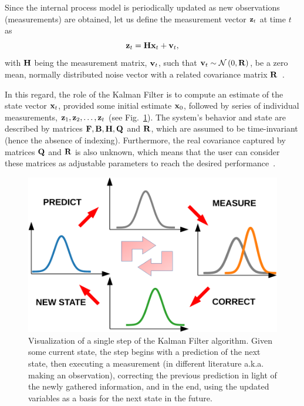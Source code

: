 Since the internal process model is periodically updated as new observations (measurements) are obtained, let us define the measurement vector $\mathbf{z}_t$ at time $t$ as
\begin{equation}
    \mathbf{z}_t = \mathbf{H} \mathbf{x}_t + \mathbf{v}_t,
\end{equation}
with $\mathbf{H}$ being the measurement matrix, $\mathbf{v}_t$, such that $\mathbf{v}_{t} \sim \mathcal{N} \left( {0, \mathbf{R}} \right)$, be a zero mean, normally distributed noise vector with a related covariance matrix $\mathbf{R}$~\cite{kim2018introduction}.

In this regard, the role of the Kalman Filter is to compute an estimate of the state vector $\mathbf{x}_t$, provided some initial estimate $\mathbf{x}_0$, followed by series of individual measurements, $\mathbf{z}_1, \mathbf{z}_2, \dots, \mathbf{z}_t$ (see Fig.~\ref{fig:KalmanFilterDiagram}). The system's behavior and state are described by matrices $\mathbf{F}, \mathbf{B}, \mathbf{H}, \mathbf{Q}$ and $\mathbf{R}$, which are assumed to be time-invariant (hence the absence of indexing). Furthermore, the real covariance captured by matrices $\mathbf{Q}$ and $\mathbf{R}$ is also unknown, which means that the user can consider these matrices as adjustable parameters to reach the desired performance~\cite{kim2018introduction}.

\begin{figure}[t]
    \centerline{\includegraphics[width=0.7\linewidth]{figures/theoretical_foundations/kalman_filter_diagram.pdf}}
    \caption[A single iteration of the Kalman Filter]{Visualization of a single step of the Kalman Filter algorithm. Given some current state, the step begins with a prediction of the next state, then executing a measurement (in different literature a.k.a. making an observation), correcting the previous prediction in light of the newly gathered information, and in the end, using the updated variables as a basis for the next state in the future.}
    \label{fig:KalmanFilterDiagram}
\end{figure}


